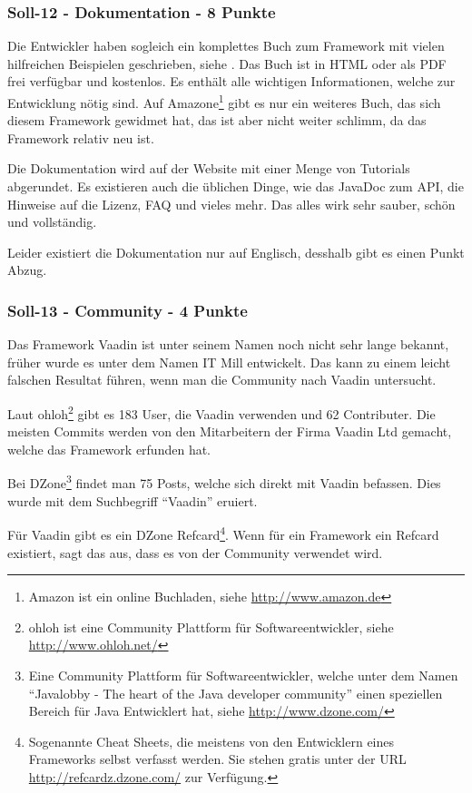   \subsubsection{Soll-12 - Dokumentation - 8 Punkte}
  
  Die Entwickler haben sogleich ein komplettes Buch zum Framework mit vielen
  hilfreichen Beispielen geschrieben, siehe \cite{BookOfVaadin}. Das Buch ist
  in \ac{HTML} oder als \ac{PDF} frei verfügbar und kostenlos. Es enthält alle
  wichtigen Informationen, welche zur Entwicklung nötig sind. Auf
  Amazone\footnote{Amazon ist ein online Buchladen, siehe
  \url{http://www.amazon.de}} gibt es nur ein weiteres Buch, das sich diesem
  Framework gewidmet hat, das ist aber nicht weiter schlimm, da das Framework
  relativ neu ist.
  
  Die Dokumentation wird auf der Website mit einer Menge von Tutorials
  abgerundet. Es existieren auch die üblichen Dinge, wie das JavaDoc zum
  \ac{API}, die Hinweise auf die Lizenz, \ac{FAQ} und vieles mehr. Das alles
  wirk sehr sauber, schön und vollständig.
  
  Leider existiert die Dokumentation nur auf Englisch, desshalb gibt es einen
  Punkt Abzug.
  
  \subsubsection{Soll-13 - Community - 4 Punkte}
  
  Das Framework Vaadin ist unter seinem Namen noch nicht sehr lange bekannt,
  früher wurde es unter dem Namen IT Mill entwickelt. Das kann zu einem leicht
  falschen Resultat führen, wenn man die Community nach Vaadin untersucht.
  
  Laut ohloh\footnote{ohloh ist eine Community Plattform für
  Softwareentwickler, siehe \url{http://www.ohloh.net/}} gibt es 183 User, die
  Vaadin verwenden und 62 Contributer. Die meisten Commits werden von den
  Mitarbeitern der Firma Vaadin Ltd gemacht, welche das Framework
  erfunden hat.
  
  Bei DZone\footnote{Eine Community Plattform für Softwareentwickler, welche
  unter dem Namen ``Javalobby - The heart of the Java developer community''
  einen speziellen Bereich für Java Entwicklert hat, siehe
  \url{http://www.dzone.com/}} findet man 75 Posts, welche sich direkt mit
  Vaadin befassen. Dies wurde mit dem Suchbegriff ``Vaadin'' eruiert.
  
  Für Vaadin gibt es ein DZone Refcard\footnote{Sogenannte Cheat Sheets, die
  meistens von den Entwicklern eines Frameworks selbst verfasst werden. Sie
  stehen gratis unter der \ac{URL} \url{http://refcardz.dzone.com/} zur
  Verfügung.}. Wenn für ein Framework ein Refcard existiert, sagt das aus, dass
  es von der Community verwendet wird.
  
